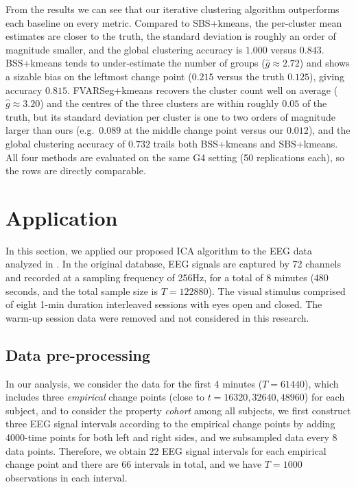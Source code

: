 \documentclass[11pt]{article}
\begin{document}
From the results we can see that our iterative clustering algorithm outperforms each baseline on every metric. Compared to SBS+kmeans, the per-cluster mean estimates are closer to the truth, the standard deviation is roughly an order of magnitude smaller, and the global clustering accuracy is $1.000$ versus $0.843$. BSS+kmeans tends to under-estimate the number of groups ($\widehat{g} \approx 2.72$) and shows a sizable bias on the leftmost change point ($0.215$ versus the truth $0.125$), giving accuracy $0.815$. FVARSeg+kmeans recovers the cluster count well on average ($\widehat{g} \approx 3.20$) and the centres of the three clusters are within roughly $0.05$ of the truth, but its standard deviation per cluster is one to two orders of magnitude larger than ours (e.g.\ $0.089$ at the middle change point versus our $0.012$), and the global clustering accuracy of $0.732$ trails both BSS+kmeans and SBS+kmeans. All four methods are evaluated on the same G4 setting (50 replications each), so the rows are directly comparable.


\section{Application}\label{sec:application}
In this section, we applied our proposed ICA algorithm to the EEG data analyzed in \cite{trujillo2017effect}. In the original database, EEG signals are captured by 72 channels and recorded at a sampling frequency of 256Hz, for a total of 8 minutes (480 seconds, and the total sample size is $T=122880$). The visual stimulus comprised of eight 1-min duration interleaved sessions with eyes open and closed. The warm-up session data were removed and not considered in this research. 


\subsection{Data pre-processing}
In our analysis, we consider the data for the first 4 minutes ($T=61440$), which includes three \emph{empirical} change points (close to $t=16320, 32640, 48960$) for each subject, and to consider the property \emph{cohort} among all subjects, we first construct three EEG signal intervals according to the empirical change points by adding 4000-time points for both left and right sides, and we subsampled data every 8 data points. Therefore, we obtain 22 EEG signal intervals for each empirical change point and there are 66 intervals in total, and we have $T=1000$ observations in each interval.    
\end{document}

